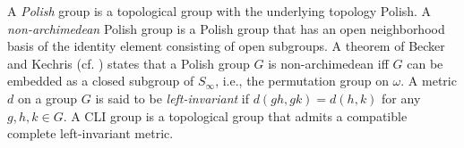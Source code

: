 \documentclass[11pt]{amsart}
\newtheorem{theorem}{Theorem}[section]
\theoremstyle{definition}
\theoremstyle{remark}
\numberwithin{equation}{section}
\def\gnb#1{G_{\langle #1\rangle}}
\begin{document}




A {\it Polish} group is a topological group with the underlying topology Polish. A {\it non-archimedean} Polish group is a Polish group that has an open neighborhood basis of the identity element consisting of open subgroups. A theorem of Becker and Kechris (cf. \cite[Theorem 1.5.1]{BK}) states that a Polish group $G$ is non-archimedean iff $G$ can be embedded as a closed subgroup of $S_\infty$, i.e., the permutation group on $\omega$. A metric $d$ on a group $G$ is said to be {\it left-invariant} if $d(gh,gk)=d(h,k)$ for any $g,h,k\in G$. A CLI group is a topological group that admits a compatible complete left-invariant metric.
\end{document}
